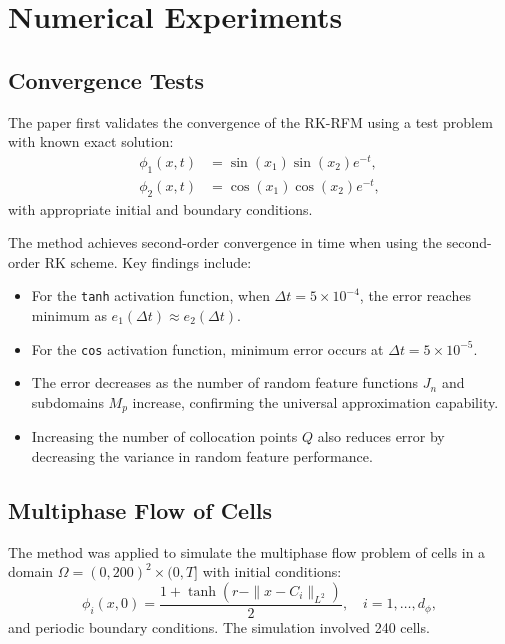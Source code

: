 \documentclass[11pt]{article}
\begin{document}
\section{Numerical Experiments}

\subsection{Convergence Tests}

The paper first validates the convergence of the RK-RFM using a test problem with known exact solution:
\begin{align}
    \phi_1(x,t) &= \sin(x_1)\sin(x_2)e^{-t}, \\
    \phi_2(x,t) &= \cos(x_1)\cos(x_2)e^{-t},
\end{align}
with appropriate initial and boundary conditions.

The method achieves second-order convergence in time when using the second-order RK scheme. Key findings include:

\begin{itemize}
    \item For the \texttt{tanh} activation function, when $\Delta t = 5 \times 10^{-4}$, the error reaches minimum as $e_1(\Delta t) \approx e_2(\Delta t)$.
    \item For the \texttt{cos} activation function, minimum error occurs at $\Delta t = 5 \times 10^{-5}$.
    \item The error decreases as the number of random feature functions $J_n$ and subdomains $M_p$ increase, confirming the universal approximation capability.
    \item Increasing the number of collocation points $Q$ also reduces error by decreasing the variance in random feature performance.
\end{itemize}

\subsection{Multiphase Flow of Cells}

The method was applied to simulate the multiphase flow problem of cells in a domain $\Omega = (0,200)^2 \times (0,T]$ with initial conditions:
\begin{equation}
    \phi_i(x,0) = \frac{1 + \tanh\left(r - \|x - C_i\|_{L^2}\right)}{2}, \quad i = 1, \ldots, d_\phi,
\end{equation}
and periodic boundary conditions. The simulation involved 240 cells.
\end{document}
